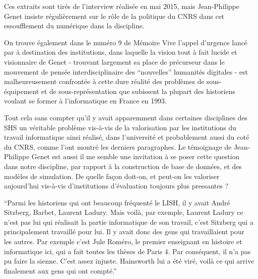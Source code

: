 Ces extraits sont tirés de l'interview réalisée en mai 2015, mais Jean-Philippe Genet insiste régulièrement sur le rôle de la politique du CNRS dans cet essoufflement du numérique dans la discipline.

On trouve également dans le numéro 9 de Mémoire Vive l'appel d'urgence lancé par \textcite{Genet1993} à destination des institutions, dans laquelle la vision tout à fait lucide et visionnaire de Genet - trouvant largement sa place de précurseur dans le mouvement de pensée interdisciplinaire des \enquote{nouvelles} humanités digitales  - est malheureusement confrontée à cette dure réalité des problèmes de sous-équipement et de sous-représentation que subissent la plupart des historiens voulant se former à l'informatique en France en 1993.

Tout cela sans compter qu'il y avait apparemment dans certaines disciplines des SHS un véritable problème vis-à-vis de la valorisation par les institutions du travail informatique ainsi réalisé, dans l'université et probablement aussi du coté du CNRS, comme l'ont montré les derniers paragraphes. Le témoignage de Jean-Philippe Genet est aussi il me semble une invitation à se poser cette question dans notre discipline, par rapport à la construction de base de données, et des modèles de simulation. De quelle façon doit-on, et peut-on les valoriser aujourd'hui vis-à-vis d'institutions d'évaluation toujours plus pressantes ?

\enquote{Parmi les historiens qui ont beaucoup fréquenté le LISH, il y avait André Sitzberg, Barbet, Laurent Ladury. Mais voilà, par exemple, Laurent Ladury ce n'est pas lui qui réalisait la partie informatique de son travail, c'est Sitzberg qui a principalement travaillé pour lui. Il y avait donc des gens qui travaillaient pour les autres. Par exemple c'est Jule Roméro, le premier enseignant en histoire et informatique ici, qui a fait toutes les thèses de Paris 4. Par conséquent, il n'a pas pu faire la sienne. C'est assez injuste. Hainsworth lui a été viré, voilà ce qui arrive finalement aux gens qui ont compté.}

